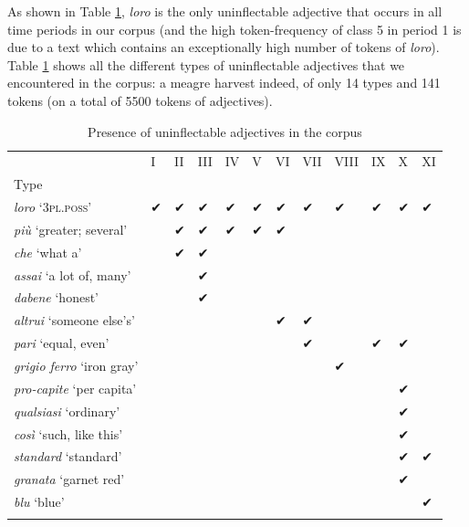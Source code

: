 \documentclass[output=paper,colorlinks,citecolor=brown]{langscibook}
\begin{document}
As shown in Table \ref{10tab18}, \emph{loro} is the only uninflectable adjective that occurs in all time periods in our corpus (and the high token-frequency of class 5 in period 1 is due to a text which contains an exceptionally high number of tokens of \emph{loro}). Table \ref{10tab18} shows all the different types of uninflectable adjectives that we encountered in the corpus: a meagre harvest indeed, of only 14 types and 141 tokens (on a total of 5500 tokens of adjectives).

\begin{table}[ht]
	\centering
	\begin{tabularx}{\textwidth}{llllllllllll}
		\lsptoprule
			\multicolumn{1}{r}{Time period} & I & II & III & IV & V & VI & VII & VIII & IX & X & XI \\
			\multicolumn{1}{l}{Type} & & & & & & & & & & & \\
			\midrule
			\emph{loro} ‘\textsc{3pl.poss}’ & ✔ & ✔ & ✔ & ✔ & ✔ & ✔ & ✔ & ✔ & ✔ & ✔ & ✔ \\
			\midrule
			\emph{più} ‘greater; several’ & & ✔ & ✔ & ✔ & ✔ & ✔ & & & & & \\
			\midrule
			\emph{che} ‘what a’ & & ✔ & ✔ & & & & & & & & \\
			\midrule
			\emph{assai} ‘a lot of, many’ & & & ✔ & & & & & & & & \\
			\midrule
			\emph{dabene} ‘honest’ & & & ✔ & & & & & & & & \\
			\midrule
			\emph{altrui} ‘someone else’s’ & & & & & & ✔ & ✔ & & & & \\
			\midrule
			\emph{pari} ‘equal, even’ & & & & & & & ✔ & & ✔ & ✔ & \\
			\midrule
			\emph{grigio ferro} ‘iron gray’ & & & & & & & & ✔ & & & \\
			\midrule
			\emph{pro-capite} ‘per capita’ & & & & & & & & & & ✔ & \\
			\midrule
			\emph{qualsiasi} ‘ordinary’ & & & & & & & & & & ✔ & \\
			\midrule
			\emph{così} ‘such, like this’ & & & & & & & & & & ✔ & \\
			\midrule
			\emph{standard} ‘standard’ & & & & & & & & & & ✔ & ✔ \\
			\midrule
			\emph{granata} ‘garnet red’ & & & & & & & & & & ✔ & \\
			\midrule
			\emph{blu} ‘blue’ & & & & & & & & & & & ✔ \\
		\lspbottomrule
	\end{tabularx}
	\caption{Presence of uninflectable adjectives in the corpus}
	\label{10tab18}
\end{table}
\end{document}
